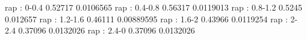 rap : 0-0.4
0.52717 0.0106565
rap : 0.4-0.8
0.56317 0.0119013
rap : 0.8-1.2
0.5245 0.012657
rap : 1.2-1.6
0.46111 0.00889595
rap : 1.6-2
0.43966 0.0119254
rap : 2-2.4
0.37096 0.0132026
rap : 2.4-0
0.37096 0.0132026
